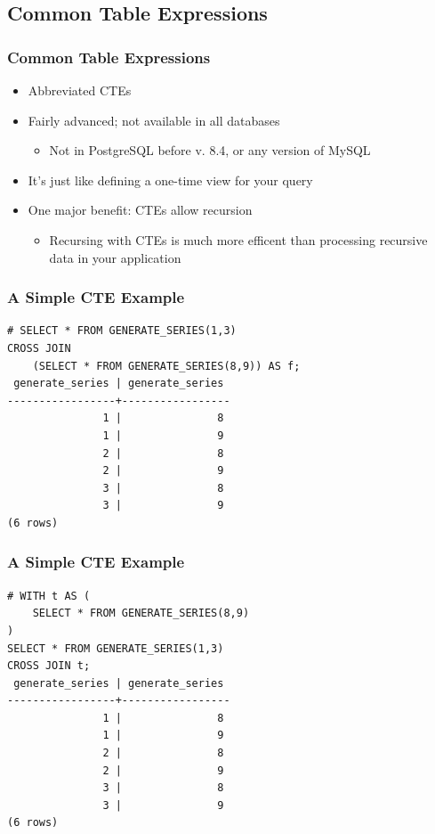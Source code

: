 \documentclass{beamer}
\begin{document}
\subsection{Common Table Expressions}
\begin{frame}
    \frametitle{Common Table Expressions}
    \begin{itemize}
        \item Abbreviated CTEs
        \pause
        \item Fairly advanced; not available in all databases
        \pause
        \begin{itemize}
            \item Not in PostgreSQL before v. 8.4, or any version of MySQL
        \end{itemize}
        \item It's just like defining a one-time view for your query
        \pause
        \item One major benefit: CTEs allow recursion
        \pause
        \begin{itemize}
            \item Recursing with CTEs is much more efficent than processing recursive data in your application
        \end{itemize}
    \end{itemize}
\end{frame}

\begin{frame}[fragile]
    \frametitle{A Simple CTE Example}
    \begin{verbatim}
# SELECT * FROM GENERATE_SERIES(1,3)
CROSS JOIN
    (SELECT * FROM GENERATE_SERIES(8,9)) AS f;
 generate_series | generate_series
-----------------+-----------------
               1 |               8
               1 |               9
               2 |               8
               2 |               9
               3 |               8
               3 |               9
(6 rows)
    \end{verbatim}
\end{frame}

\begin{frame}[fragile]
    \frametitle{A Simple CTE Example}
    \begin{verbatim}
# WITH t AS (
    SELECT * FROM GENERATE_SERIES(8,9)
)
SELECT * FROM GENERATE_SERIES(1,3)
CROSS JOIN t;
 generate_series | generate_series
-----------------+-----------------
               1 |               8
               1 |               9
               2 |               8
               2 |               9
               3 |               8
               3 |               9
(6 rows)
    \end{verbatim}
\end{frame}
\end{document}
